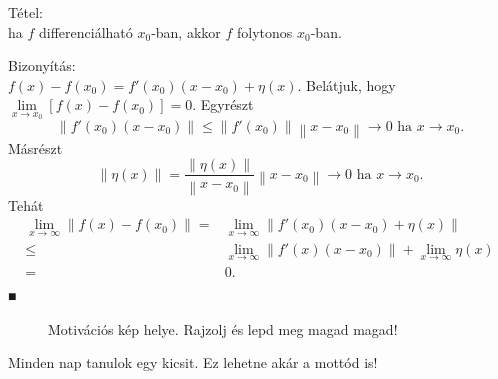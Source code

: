 \documentclass[12pt,a4paper]{scrartcl}
\newenvironment{tetel}{}{}
\newenvironment{bizonyitas}{}{}
\newenvironment{ajanlofig}{\begin{figure}\begin{center}}{
\end{center}\end{figure}}
\begin{document}
\begin{tetel}

Tétel:\\
ha \(f\) differenciálható \(x_{0}\)-ban, akkor \(f\) folytonos
\(x_{0}\)-ban.

\end{tetel}

\begin{bizonyitas}

Bizonyítás:\\
\(f\left( x \right) - f\left( x_{0} \right) = f'\left( x_{0} \right)\left( {x - x_{0}} \right) + \eta\left( x \right)\).
Belátjuk, hogy
\(\underset{x\rightarrow x_{0}}{\lim}\left\lbrack {f\left( x \right) - f\left( x_{0} \right)} \right\rbrack = 0\).
Egyrészt
\[\left. \left\| {f'\left( x_{0} \right)\left( {x - x_{0}} \right)} \right\| \leq \left\| {f'\left( x_{0} \right)} \right\|\left\| {x - x_{0}} \right\|\rightarrow 0\text{~ha~}x\rightarrow x_{0}. \right.\]
Másrészt
\[\left. \left\| {\eta\left( x \right)} \right\| = \frac{\left\| {\eta\left( x \right)} \right\|}{\left\| {x - x_{0}} \right\|}\left\| {x - x_{0}} \right\|\rightarrow 0\text{~ha~}x\rightarrow x_{0}. \right.\]
Tehát \[\begin{aligned}
  \mathop {\lim }\limits_{x \to \infty } \left\| {f\left( x \right) - f\left( {{x_0}} \right)} \right\| =  & \mathop {\lim }\limits_{x \to \infty } \left\| {f'\left( {{x_0}} \right)\left( {x - {x_0}} \right) + \eta \left( x \right)} \right\| \\ 
   \leqslant  & \mathop {\lim }\limits_{x \to \infty } \left\| {f'\left( x \right)\left( {x - {x_0}} \right)} \right\| + \mathop {\lim }\limits_{x \to \infty } \eta \left( x \right) \\ 
   =  & 0. \\ 
\end{aligned} \] ■

\end{bizonyitas}

\begin{ajanlo}

\begin{ajanlofig}

Motivációs kép helye. Rajzolj és lepd meg magad magad!

\end{ajanlofig}

Minden nap tanulok egy kicsit. Ez lehetne akár a mottód is!

\end{ajanlo}
\end{document}
